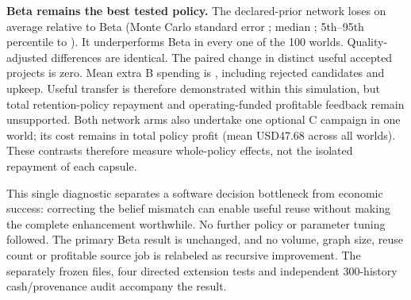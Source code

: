 \textbf{Beta remains the best tested policy.} The declared-prior network loses  on average relative to Beta (Monte Carlo standard error ; median ; 5th--95th percentile  to ). It underperforms Beta in every one of the 100 worlds. Quality-adjusted differences are identical. The paired change in distinct useful accepted projects is zero. Mean extra B spending is , including rejected candidates and upkeep. Useful transfer is therefore demonstrated within this simulation, but total retention-policy repayment and operating-funded profitable feedback remain unsupported. Both network arms also undertake one optional C campaign in one world; its cost remains in total policy profit (mean USD47.68 across all worlds). These contrasts therefore measure whole-policy effects, not the isolated repayment of each capsule.

This single diagnostic separates a software decision bottleneck from economic success: correcting the belief mismatch can enable useful reuse without making the complete enhancement worthwhile. No further policy or parameter tuning followed. The primary Beta result is unchanged, and no volume, graph size, reuse count or profitable source job is relabeled as recursive improvement. The separately frozen files, four directed extension tests and independent 300-history cash/provenance audit accompany the result.
